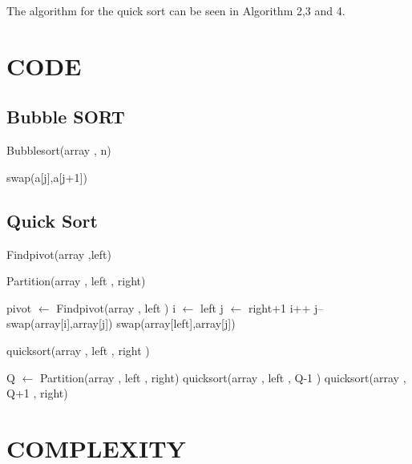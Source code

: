 \documentclass{article}
\begin{document}
The algorithm for the quick sort can be seen in Algorithm 2,3 and 4.
\section{CODE}
\subsection{Bubble SORT}
\begin{algorithm}
\caption{Bubblesort(array , n)}
\begin{algorithmic}
 

	
\STATE swap(a[j],a[j+1])
\ENDIF
\ENDFOR
\ENDFOR
\end{algorithmic}
\end{algorithm}
\subsection{Quick Sort}
\begin{algorithm}
\caption{Findpivot(array ,left)}
\begin{algorithmic}
\end{algorithmic}
\end{algorithm}
\begin{algorithm}
\caption{Partition(array , left , right)}
\begin{algorithmic}
 \STATE pivot {$\leftarrow$} Findpivot(array , left )
 \STATE i {$\leftarrow$} left
 \STATE j {$\leftarrow$} right+1
	\STATE i++	
	\ENDWHILE
	\STATE j--	
	\ENDWHILE
	\STATE swap(array[i],array[j])
        \ELSE
	\STATE swap(array[left],array[j])
	\ENDIF
 \ENDWHILE
	
\end{algorithmic}
\end{algorithm}
\begin{algorithm}
\caption{quicksort(array , left , right )}
\begin{algorithmic}
 {
	\STATE Q {$\leftarrow$} Partition(array , left , right)
	\STATE quicksort(array , left , Q-1 )
	\STATE quicksort(array , Q+1 , right)
  \ENDIF
 }
\end{algorithmic}
\end{algorithm}


\section{COMPLEXITY}
\end{document}
